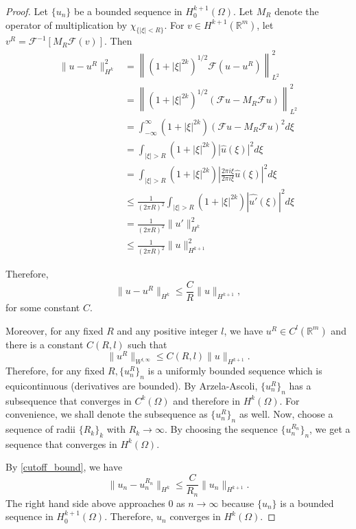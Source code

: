 \documentclass[a4paper]{article}
\newcommand{\R}{\mathbb{R}}
\begin{document}
\begin{enumerate}
    \begin{proof}
      Let $\{u_n\}$ be a bounded sequence in $H^{k+1}_0(\Omega)$. Let $M_R$ denote the operator of multiplication by $\chi_{ \{|\xi| < R \} }$. For $ v
      \in H^{k+1}(\R^m)$, let ${v^R = \mathcal{F}^{-1} \left[ M_R \mathcal{F} (v) \right] }$.
      Then
      \begin{align*}
        \| u - u^R \|_{H^k}^2 &= \left\| (1 + |\xi|^{2k})^{1/2} \mathcal{F} (u - u^R) \right\|_{L^2}^2 \\
        &= \left\| (1 + |\xi|^{2k})^{1/2} ( \mathcal{F}u - M_R \mathcal{F} u ) \right\|_{L^2}^2 \\
        &= \int_{-\infty}^{\infty} (1 + |\xi|^{2k}) ( \mathcal{F} u - M_R \mathcal{F} u)^2 d\xi \\
        &= \int_{|\xi|>R}^{} (1 + |\xi|^{2k}) |\hat{u} (\xi)|^2 d\xi \\
        &= \int_{|\xi|>R}^{} (1 + |\xi|^{2k}) \left| \frac{2 \pi i \xi}{2 \pi i \xi} \hat{u}(\xi) \right|^2 d\xi \\
        &\leq \frac{1}{(2 \pi R)^2} \int_{|\xi|>R}^{} (1 + |\xi|^{2k}) | \widehat{u'} (\xi) |^2 d \xi \\
        &= \frac{1}{(2 \pi R)^2} \|u'\|_{H^k}^2 \\
        &\leq \frac{1}{(2 \pi R)^2} \|u\|_{H^{k+1}}^2
      \end{align*}

      Therefore,
      \begin{equation} \label{cutoff_bound}
        \|u - u^R\|_{H^k} \leq \frac{C}{R} \|u\|_{H^{k+1}} ,
      \end{equation}
      for some constant $C$.

      Moreover, for any fixed $R$ and any positive integer $l$, we have $u^R \in C^l(\R^m)$ and there is a constant $C(R,l)$ such that
      \[ \|u^R\|_{W^{l,\infty}} \leq C(R,l) \|u\|_{H^{k+1}} .\]
      Therefore, for any fixed $R, \{u^R_n\}_n$ is a uniformly bounded sequence which is equicontinuous (derivatives are bounded).
      By Arzela-Ascoli, $\{u^R_n\}_n$ has a subsequence that converges in $C^k(\Omega)$ and therefore in $H^k(\Omega)$. For convenience, we shall
      denote the subsequence as $\{u_n^R\}_n$ as well.
      Now, choose a sequence of radii $\{R_k\}_k$ with $R_k \to \infty$.
      By choosing the sequence $\{u_n^{R_n} \}_n$, we get a sequence that converges in $H^k(\Omega)$.

      By \eqref{cutoff_bound}, we have
      \[ \| u_n - u_n^{R_n} \|_{H^k} \leq \frac{C}{R_n} \|u_n\|_{H^{k+1}} .\]
      The right hand side above approaches 0 as $n \to \infty$ because $\{u_n\}$ is a bounded sequence in $H^{k+1}_0(\Omega)$. Therefore, $u_n$
      converges in $H^k(\Omega)$.
    \end{proof}

\end{enumerate}
\end{document}
